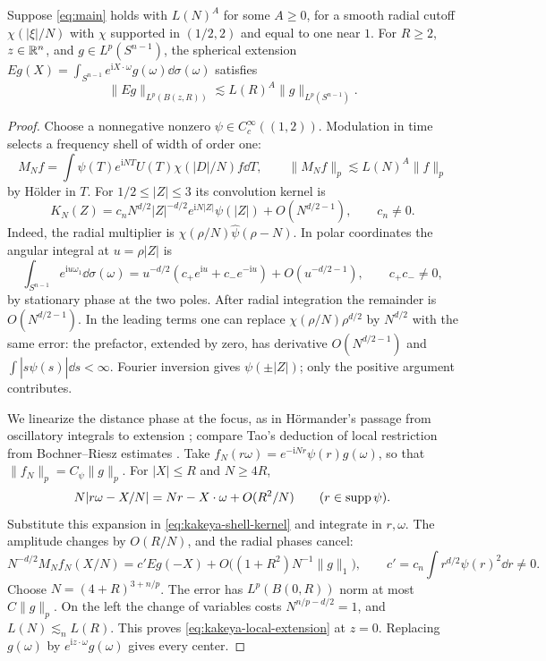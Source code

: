 \begin{lemma}\label{lem:kakeya-local-extension}
Suppose \eqref{eq:main} holds with \(L(N)^A\) for some \(A\ge0\), for a
smooth radial cutoff \(\chi(|\xi|/N)\) with \(\chi\) supported in
\((1/2,2)\) and equal to one near \(1\). For \(R\ge2\), \(z\in\mathbb R^n\),
and \(g\in L^p(S^{n-1})\), the spherical extension
\(Eg(X)=\int_{S^{n-1}}e^{\mathrm iX\cdot\omega}g(\omega)\dd\sigma(\omega)\)
satisfies
\begin{equation}\label{eq:kakeya-local-extension}
             \|Eg\|_{L^p(B(z,R))}
                   \lesssim L(R)^A\|g\|_{L^p(S^{n-1})}.
\end{equation}
\end{lemma}

\begin{proof}
Choose a nonnegative nonzero \(\psi\in C_c^\infty((1,2))\).
Modulation in time selects a frequency shell of width of order one:
\[
 M_N f=\int \psi(T)e^{\mathrm iNT}U(T)\chi(|D|/N)f\dd T,\qquad
 \|M_N f\|_p\lesssim L(N)^A\|f\|_p
\]
by H\"older in \(T\). For \(1/2\le |Z|\le3\) its convolution kernel is
\begin{equation}\label{eq:kakeya-shell-kernel}
 K_N(Z)=c_n N^{d/2}|Z|^{-d/2}e^{\mathrm iN|Z|}\psi(|Z|)
                         +O(N^{d/2-1}),\qquad c_n\ne0 .
\end{equation}
Indeed, the radial multiplier is \(\chi(\rho/N)\widehat\psi(\rho-N)\).
In polar coordinates the angular integral at \(u=\rho|Z|\) is
\[
 \int_{S^{n-1}}e^{\mathrm iu\omega_1}\dd\sigma(\omega)
   =u^{-d/2}(c_+e^{\mathrm iu}+c_-e^{-\mathrm iu})
                       +O(u^{-d/2-1}),\qquad c_+c_-\ne0 ,
\]
by stationary phase at the two poles. After radial integration the
remainder is \(O(N^{d/2-1})\). In the leading terms one can replace
\(\chi(\rho/N)\rho^{d/2}\) by \(N^{d/2}\) with the same error:
the prefactor, extended by zero, has derivative \(O(N^{d/2-1})\)
and \(\int |s\widehat\psi(s)|\dd s<\infty\). Fourier inversion gives
\(\psi(\pm|Z|)\); only the positive argument contributes.

We linearize the distance phase at the focus, as in H\"ormander's passage
from oscillatory integrals to extension \cite[\S3, (3.8)--(3.9)]{Hormander1973FLp};
compare Tao's deduction of local restriction from Bochner--Riesz estimates
\cite[proof of Theorem~1.1]{Tao1999}.
Take \(f_N(r\omega)=e^{-\mathrm iNr}\psi(r)g(\omega)\), so that
\(\|f_N\|_p=C_\psi\|g\|_p\). For \(|X|\le R\) and \(N\ge4R\),
\[
 N|r\omega-X/N|=Nr-X\cdot\omega+O(R^2/N)
 \qquad (r\in\operatorname{supp}\psi).
\]
Substitute this expansion in \eqref{eq:kakeya-shell-kernel} and
integrate in \(r,\omega\). The amplitude changes by \(O(R/N)\), and
the radial phases cancel:
\[
 N^{-d/2}M_N f_N(X/N)
       =c' Eg(-X)+O\big((1+R^2)N^{-1}\|g\|_1\big),
 \qquad c'=c_n\int r^{d/2}\psi(r)^2\dd r\ne0 .
\]
Choose \(N=(4+R)^{3+n/p}\). The error has \(L^p(B(0,R))\) norm at
most \(C\|g\|_p\). On the left the change of variables costs
\(N^{n/p-d/2}=1\), and \(L(N)\lesssim_n L(R)\). This proves
\eqref{eq:kakeya-local-extension} at \(z=0\). Replacing \(g(\omega)\)
by \(e^{\mathrm iz\cdot\omega}g(\omega)\) gives every center.
\end{proof}

